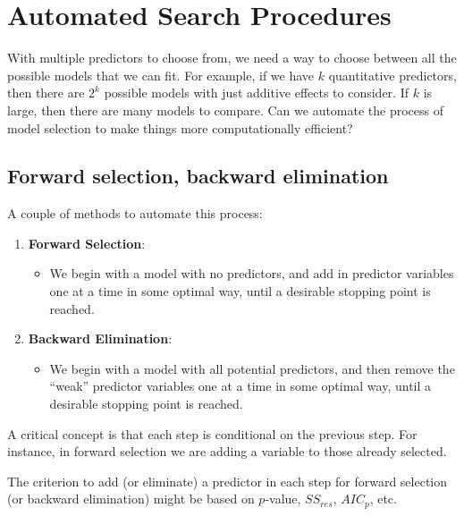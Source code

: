 \documentclass[
]{book}
\providecommand{\tightlist}{%
  \setlength{\itemsep}{0pt}\setlength{\parskip}{0pt}}
\begin{document}
\hypertarget{automated-search-procedures}{%
\section{Automated Search Procedures}\label{automated-search-procedures}}

With multiple predictors to choose from, we need a way to choose between all the possible models that we can fit. For example, if we have \(k\) quantitative predictors, then there are \(2^{k}\) possible models with just additive effects to consider. If \(k\) is large, then there are many models to compare. Can we automate the process of model selection to make things more computationally efficient?

\hypertarget{forward-selection-backward-elimination}{%
\subsection{Forward selection, backward elimination}\label{forward-selection-backward-elimination}}

A couple of methods to automate this process:

\begin{enumerate}
\def\labelenumi{\arabic{enumi}.}
\tightlist
\item
  \textbf{Forward Selection}:

  \begin{itemize}
  \tightlist
  \item
    We begin with a model with no predictors, and add in predictor variables one at a time in some optimal way, until a desirable stopping point is reached.
  \end{itemize}
\item
  \textbf{Backward Elimination}:

  \begin{itemize}
  \tightlist
  \item
    We begin with a model with all potential predictors, and then remove the ``weak'' predictor variables one at a time in some optimal way, until a desirable stopping point is reached.
  \end{itemize}
\end{enumerate}

A critical concept is that each step is conditional on the previous step. For instance, in forward selection we are adding a variable to those already selected.

The criterion to add (or eliminate) a predictor in each step for forward selection (or backward elimination) might be based on \(p\)-value, \(SS_{res}\), \(AIC_{p}\), etc.
\end{document}
